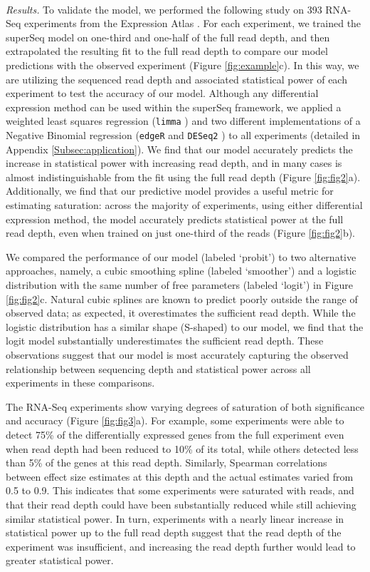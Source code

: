 \documentclass[11pt]{article}
\begin{document}
\  

\noindent \textit{Results.} To validate the model, we performed the following study on 393 RNA-Seq experiments from the Expression Atlas \cite{petryszak:2014}. For each experiment, we trained the superSeq model on one-third and one-half of the full read depth, and then extrapolated the resulting fit to the full read depth to compare our model predictions with the observed experiment (Figure \ref{fig:example}c). In this way, we are utilizing the sequenced read depth and associated statistical power of each experiment to test the accuracy of our model. Although any differential expression method can be used within the superSeq framework, we applied a weighted least squares regression (\texttt{limma} \cite{Law:2014}) and two different implementations of a Negative Binomial regression (\texttt{edgeR} \cite{robinson:2010} and \texttt{DESeq2} \cite{Love:2014}) to all experiments (detailed in Appendix \ref{Subsec:application}). We find that our model accurately predicts the increase in statistical power with increasing read depth, and in many cases is almost indistinguishable from the fit using the full read depth (Figure \ref{fig:fig2}a). Additionally, we find that our predictive model provides a useful metric for estimating saturation: across the majority of experiments, using either differential expression method, the model accurately predicts statistical power at the full read depth, even when trained on just one-third of the reads (Figure \ref{fig:fig2}b).

We compared the performance of our model (labeled `probit') to two alternative approaches, namely, a cubic smoothing spline (labeled `smoother') and a logistic distribution with the same number of free parameters (labeled `logit') in Figure \ref{fig:fig2}c. Natural cubic splines are known to predict poorly outside the range of observed data; as expected, it overestimates the sufficient read depth. While the logistic distribution has a similar shape (S-shaped) to our model, we find that the logit model substantially underestimates the sufficient read depth. These observations suggest that our model is most accurately capturing the observed relationship between sequencing depth and statistical power across all experiments in these comparisons.

The RNA-Seq experiments show varying degrees of saturation of both significance and accuracy (Figure \ref{fig:fig3}a). For example, some experiments were able to detect 75\% of the differentially expressed genes from the full experiment even when read depth had been reduced to 10\% of its total, while others detected less than 5\% of the genes at this read depth. Similarly, Spearman correlations between effect size estimates at this depth and the actual estimates varied from 0.5 to 0.9. This indicates that some experiments were saturated with reads, and that their read depth could have been substantially reduced while still achieving similar statistical power. In turn, experiments with a nearly linear increase in statistical power up to the full read depth suggest that the read depth of the experiment was insufficient, and increasing the read depth further would lead to greater statistical power. 
\end{document}
